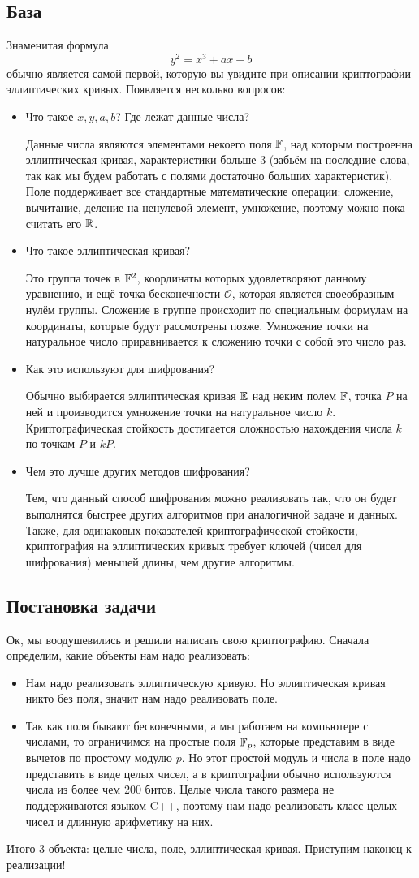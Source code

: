 \subsection{База}
Знаменитая формула
\[y^2 = x^3 + ax + b\]
обычно является самой первой, которую вы увидите при описании криптографии эллиптических кривых. Появляется несколько вопросов:
\begin{itemize}
  \item Что такое $x,y,a,b$? Где лежат данные числа?

  Данные числа являются элементами некоего поля $\mathbb F$, над которым построенна эллиптическая кривая, характеристики больше 3 (забьём на последние слова, так как мы будем работать с полями достаточно больших характеристик). Поле поддерживает все стандартные математические операции: сложение, вычитание, деление на ненулевой элемент, умножение, поэтому можно пока считать его $\mathbb R$.
  \item Что такое эллиптическая кривая?

  Это группа точек в $\mathbb F^2$, координаты которых удовлетворяют данному уравнению, и ещё точка бесконечности $\mathcal{O}$, которая является своеобразным нулём группы. Сложение в группе происходит по специальным формулам на координаты, которые будут рассмотрены позже. Умножение точки на натуральное число приравнивается к сложению точки с собой это число раз.
  \item Как это используют для шифрования?

  Обычно выбирается эллиптическая кривая $\mathbb E$ над неким полем $\mathbb F$, точка $P$ на ней и производится умножение точки на натуральное число $k$. Криптографическая стойкость достигается сложностью нахождения числа $k$ по точкам $P$ и $kP$. 
  \item Чем это лучше других методов шифрования?

  Тем, что данный способ шифрования можно реализовать так, что он будет выполнятся быстрее других алгоритмов при аналогичной задаче и данных. Также, для одинаковых показателей криптографической стойкости, криптография на эллиптических кривых требует ключей (чисел для шифрования) меньшей длины, чем другие алгоритмы.
\end{itemize}
\subsection{Постановка задачи}
Ок, мы воодушевились и решили написать свою криптографию. Сначала определим, какие объекты нам надо реализовать:
\begin{itemize}
  \item Нам надо реализовать эллиптическую кривую. Но эллиптическая кривая никто без поля, значит нам надо реализовать поле.
  \item Так как поля бывают бесконечными, а мы работаем на компьютере с числами, то ограничимся на простые поля $\mathbb F_p$, которые представим в виде вычетов по простому модулю $p$. Но этот простой модуль и числа в поле надо представить в виде целых чисел, а в криптографии обычно используются числа из более чем 200 битов. Целые числа такого размера не поддерживаются языком C++, поэтому нам надо реализовать класс целых чисел и длинную арифметику на них.
\end{itemize}

Итого 3 объекта: целые числа, поле, эллиптическая кривая. Приступим наконец к реализации!

